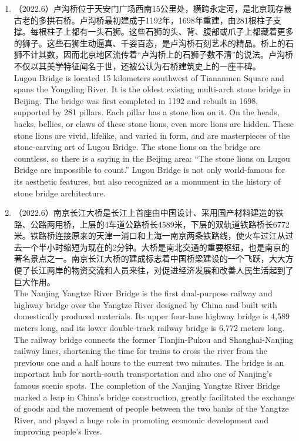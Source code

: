 ﻿\documentclass[lang=cn,11pt]{elegantbook}
\begin{document}
\begin{enumerate}
    \item （2022.6）卢沟桥位于天安门广场西南15公里处，横跨永定河，是北京现存最古老的多拱石桥。卢沟桥最初建成于1192年，1698年重建，由281根柱子支撑。每根柱子上都有一头石狮。这些石狮的头、背、腹部或爪子上都藏着更多的狮子。这些石狮生动逼真、千姿百态，是卢沟桥石刻艺术的精品。桥上的石狮不计其数，因而北京地区流传着“卢沟桥上的石狮子数不清”的说法。卢沟桥不仅以其美学特征闻名于世，还被公认为石桥建筑史上的一座丰碑。\\Lugou Bridge is located 15 kilometers southwest of Tiananmen Square and spans the Yongding River. It is the oldest existing multi-arch stone bridge in Beijing. The bridge was first completed in 1192 and rebuilt in 1698, supported by 281 pillars. Each pillar has a stone lion on it. On the heads, backs, bellies, or claws of these stone lions, even more lions are hidden. These stone lions are vivid, lifelike, and varied in form, and are masterpieces of the stone-carving art of Lugou Bridge. The stone lions on the bridge are countless, so there is a saying in the Beijing area: “The stone lions on Lugou Bridge are impossible to count.” Lugou Bridge is not only world-famous for its aesthetic features, but also recognized as a monument in the history of stone bridge architecture.
    \item （2022.6）南京长江大桥是长江上首座由中国设计、采用国产材料建造的铁路、公路两用桥，上层的4车道公路桥长4589米，下层的双轨道铁路桥长6772米。铁路桥连接原来的天津一浦口和上海一南京两条铁路线，使火车过江从过去一个半小时缩短为现在的2分钟。大桥是南北交通的重要枢纽，也是南京的著名景点之一。南京长江大桥的建成标志着中国桥梁建设的一个飞跃，大大方便了长江两岸的物资交流和人员来往，对促进经济发展和改善人民生活起到了巨大作用。\\The Nanjing Yangtze River Bridge is the first dual-purpose railway and highway bridge over the Yangtze River designed by China and built with domestically produced materials. Its upper four-lane highway bridge is 4,589 meters long, and its lower double-track railway bridge is 6,772 meters long. The railway bridge connects the former Tianjin-Pukou and Shanghai-Nanjing railway lines, shortening the time for trains to cross the river from the previous one and a half hours to the current two minutes. The bridge is an important hub for north-south transportation and also one of Nanjing’s famous scenic spots. The completion of the Nanjing Yangtze River Bridge marked a leap in China’s bridge construction, greatly facilitated the exchange of goods and the movement of people between the two banks of the Yangtze River, and played a huge role in promoting economic development and improving people’s lives.

\end{enumerate}
\end{document}
